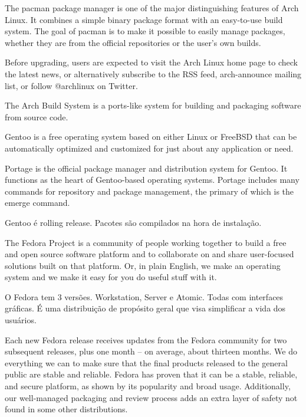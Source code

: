\documentclass[
	article,			%
	12pt,				%
	openright,			%
	oneside,			%
	a4paper,			%
	chapter=TITLE,		%
	section=TITLE,		%
	subsection=TITLE,	%
	subsubsection=TITLE,%
	subsubsubsection=TITLE, %
	english,			%
	brazil,				%
	]{abntex2}
\begin{document}
The pacman package manager is one of the major distinguishing features of Arch Linux. It combines a simple binary package format with an easy-to-use build system. The goal of pacman is to make it possible to easily manage packages, whether they are from the official repositories or the user's own builds.

\cite{ArchWiki2018b}

Before upgrading, users are expected to visit the Arch Linux home page to check the latest news, or alternatively subscribe to the RSS feed, arch-announce mailing list, or follow @archlinux on Twitter.

\cite{ArchWiki2018c}

The Arch Build System is a ports-like system for building and packaging software from source code.

\cite{ArchWiki2018d}


Gentoo is a free operating system based on either Linux or FreeBSD that can be automatically optimized and customized for just about any application or need.

\cite{GentooWiki2018}

Portage is the official package manager and distribution system for Gentoo. It functions as the heart of Gentoo-based operating systems. Portage includes many commands for repository and package management, the primary of which is the emerge command.

\cite{GentooFundation2018}

Gentoo é rolling release.
Pacotes são compilados na hora de instalação.


The Fedora Project is a community of people working together to build a free and open source software platform and to collaborate on and share user-focused solutions built on that platform. Or, in plain English, we make an operating system and we make it easy for you do useful stuff with it.

\cite{FedoraProject2018}

O Fedora tem 3 versões. Workstation, Server e Atomic. Todas com interfaces gráficas. É uma distribuição de propósito geral que visa simplificar a vida dos usuários.

Each new Fedora release receives updates from the Fedora community for two subsequent releases, plus one month -- on average, about thirteen months. We do everything we can to make sure that the final products released to the general public are stable and reliable. Fedora has proven that it can be a stable, reliable, and secure platform, as shown by its popularity and broad usage. Additionally, our well-managed packaging and review process adds an extra layer of safety not found in some other distributions.
\end{document}
